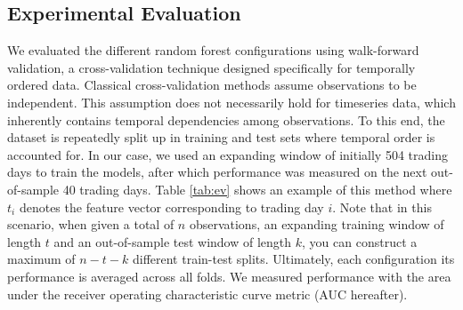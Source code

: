 \documentclass[preprint,1p, times,authoryear]{elsarticle}
\begin{document}
\subsection{Experimental Evaluation}
\label{meth:eval}
We evaluated the different random forest configurations using walk-forward validation, a cross-validation technique designed specifically for temporally ordered data. Classical cross-validation methods assume observations to be independent. This assumption does not necessarily hold for timeseries data, which inherently contains temporal dependencies among observations. To this end, the dataset is repeatedly split up in training and test sets where temporal order is accounted for. In our case, we used an expanding window of initially 504 trading days to train the models, after which performance was measured on the next out-of-sample 40 trading days. Table \ref{tab:ev} shows an example of this method where $t_{i}$ denotes the feature vector corresponding to trading day $i$. Note that in this scenario, when given a total of $n$ observations, an expanding training window of length $t$ and an out-of-sample test window of length $k$, you can construct a maximum of $n-t-k$ different train-test splits. Ultimately, each configuration its performance is averaged across all folds. We measured performance with the area under the receiver operating characteristic curve metric (AUC hereafter). 
\end{document}
